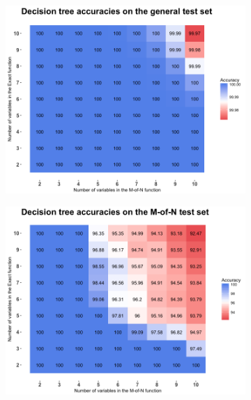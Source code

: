 \documentclass[letterpaper]{article} %
\begin{document}
 \begin{figure}
    \centering
    \begin{subfigure}[t]{0.45\textwidth}
        \includegraphics[width = 1 \linewidth]{Figures/Heatmap_ME_DT_general.png}
		\caption{}       
        \label{fig:Heatmap_ME_DT_general}
    \end{subfigure}%

    \begin{subfigure}[t]{0.45\textwidth}
        \includegraphics[width = 1 \linewidth]{Figures/Heatmap_ME_DT_M.png}
		\caption{}       
        \label{fig:Heatmap_ME_DT_M}
    \end{subfigure}%


\end{figure}
\end{document}
